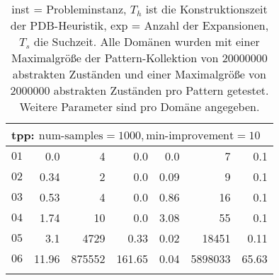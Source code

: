 \begin{longtable}{|c||r|r|r||r|r|r|}
\multicolumn{7}{|l|}{tpp: $\text{num-samples}=1000,\text{min-improvement}=10$}\\\hline
$01$ & 0.0 & 4 & 0.0 & 0.0 & 7 & 0.1 \\\hline
$02$ & 0.34 & 2 & 0.0 & 0.09 & 9 & 0.1 \\\hline
$03$ & 0.53 & 4 & 0.0 & 0.86 & 16 & 0.1 \\\hline
$04$ & 1.74 & 10 & 0.0 & 3.08 & 55 & 0.1 \\\hline
$05$ & 3.1 & 4729 & 0.33 & 0.02 & 18451 & 0.11 \\\hline
$06$ & 11.96 & 875552 & 161.65 & 0.04 & 5898033 & 65.63 \\\hline


\caption{inst = Probleminstanz, $T_h$ ist die Konstruktionszeit der PDB-Heuristik, exp = Anzahl der Expansionen, $T_s$
die Suchzeit. Alle Domänen wurden mit einer Maximalgröße der Pattern-Kollektion von $20000000$ abstrakten Zuständen und 
einer Maximalgröße von $2000000$ abstrakten Zuständen pro Pattern getestet. Weitere Parameter sind pro Domäne angegeben.}
\end{longtable}